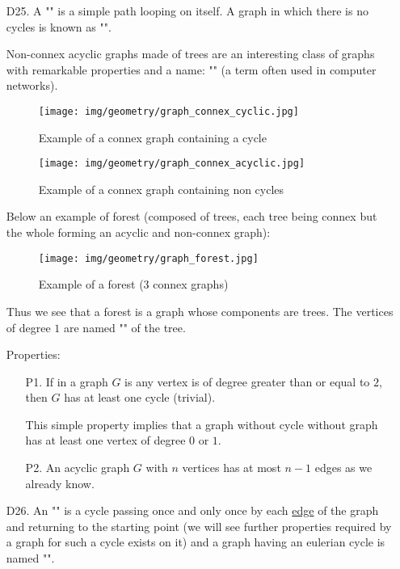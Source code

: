 {\begin{enumerate}
	\item[D25.] A "" is a simple path looping on itself. A graph in which there is no cycles is known as ""\label{acyclic graph}.
	
	Non-connex acyclic graphs made of trees are an interesting class of graphs with remarkable properties and a name: "" (a term often used in computer networks).
	\begin{figure}[H]
		\centering
		\texttt{[image: img/geometry/graph\_connex\_cyclic.jpg]}
		\caption{Example of a connex graph containing a cycle}
	\end{figure}
	\begin{figure}[H]
		\centering
		\texttt{[image: img/geometry/graph\_connex\_acyclic.jpg]}
		\caption{Example of a connex graph containing non cycles}
	\end{figure}
	Below an example of forest (composed of trees, each tree being connex but the whole forming an acyclic and non-connex graph):
	\begin{figure}[H]
		\centering
		\texttt{[image: img/geometry/graph\_forest.jpg]}
		\caption{Example of a forest (3 connex graphs)}
	\end{figure}
	Thus we see that a forest is a graph whose components are trees. The vertices of degree $1$ are named "" of the tree.
	
	Properties:
	\begin{enumerate}
		\item[P1.] If in a graph $G$ is any vertex is of degree greater than or equal to $2$, then $G$ has at least one cycle (trivial).
		\begin{tcolorbox}[title=Remark,colframe=black,arc=10pt]
		This simple property implies that a graph without cycle without graph has at least one vertex of degree $0$ or $1$.
	\end{tcolorbox}	
		
		\item[P2.] An acyclic graph $G$ with $n$ vertices has at most $n-1$ edges as we already know.
	\end{enumerate}

	\item[D26.] An "" is a cycle passing once and only once by each \underline{edge} of the graph and returning to the starting point (we will see further properties required by a graph for such a cycle exists on it) and a graph having an eulerian cycle is named "".
	

\end{enumerate}}
